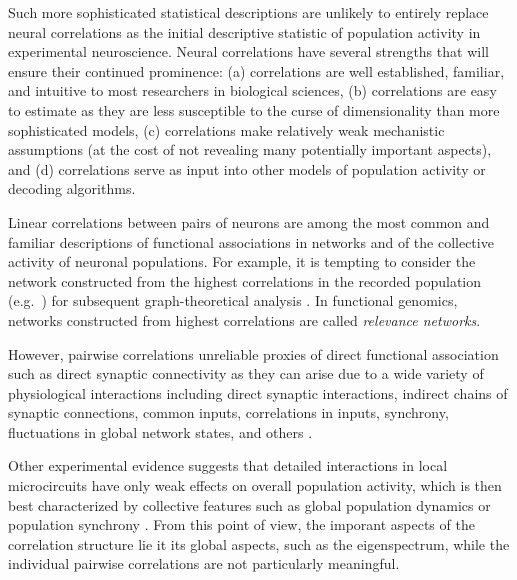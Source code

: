 Such more sophisticated statistical descriptions are unlikely to entirely replace neural correlations as the initial descriptive statistic of population activity in experimental neuroscience. Neural correlations have several strengths that will ensure their continued prominence: (a) correlations are well established, familiar, and intuitive to most researchers in biological sciences, (b) correlations are easy to estimate as they are less susceptible to the curse of dimensionality than more sophisticated models, (c) correlations make relatively weak mechanistic assumptions (at the cost of not revealing many potentially important aspects), and (d) correlations serve as input into other models of population activity or decoding algorithms. 

Linear correlations between pairs of neurons are among the most common and familiar descriptions of functional associations in networks and of the collective activity of neuronal populations.  For example, it is tempting to consider the network constructed from the highest correlations in the recorded population (e.g.~\cite{Malmersjo:2013}) for subsequent graph-theoretical analysis \citep{Feldt:2011}.  In functional genomics, networks constructed from highest correlations are called \emph{relevance networks}.

However, pairwise correlations unreliable proxies of direct functional association such as direct synaptic connectivity as they can arise due to a wide variety of physiological interactions including direct synaptic interactions, indirect chains of synaptic connections, common inputs, correlations in inputs, synchrony, fluctuations in global network states, and others \citep{Shadlen:1998,Ostojic:2009,Pernice:2011,Schneidman:2006}.

Other experimental evidence suggests that detailed interactions in local microcircuits have only weak effects on overall population activity, which is then best characterized by collective features such as global population dynamics or population synchrony \citep{Okun:2012,Tkacik:2012,Tkacik:2013}.  From this point of view, the imporant aspects of the correlation structure lie it its global aspects, such as the eigenspectrum, while the individual pairwise correlations are not particularly meaningful.
